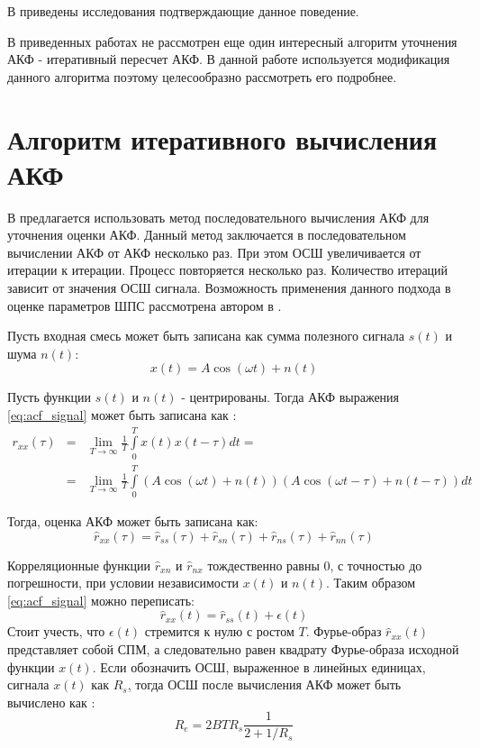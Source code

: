 В \cite{lacoss_spectral_est, chen_spectral_est, marple_1977} приведены исследования подтверждающие данное поведение.

В приведенных работах не рассмотрен еще один интересный алгоритм уточнения АКФ - итеративный пересчет АКФ. В данной работе используется
модификация данного алгоритма поэтому целесообразно рассмотреть его подробнее.

\section{Алгоритм итеративного вычисления АКФ}
\label{sec_ostanin}
В \cite{ostanin_akf} предлагается использовать метод последовательного вычисления АКФ для уточнения оценки АКФ. Данный метод
заключается в последовательном вычислении АКФ от АКФ несколько раз. При этом ОСШ увеличивается от итерации к итерации.
Процесс повторяется несколько раз. Количество итераций зависит от значения ОСШ сигнала. Возможность применения данного подхода в оценке параметров ШПС рассмотрена
автором в \cite{my_acf_cdma}.

Пусть входная смесь может быть записана как сумма полезного сигнала ${s(t)}$ и шума ${n(t)}$:
\begin{equation}
	\label{eq:acf_signal}
	x(t) = A \cos{(\omega t)} + n(t)
\end{equation}

Пусть функции ${s(t)}$ и ${n(t)}$ - центрированы. Тогда АКФ выражения \ref{eq:acf_signal} может быть записана как \cite{book_max}:
\begin{eqnarray}
	\label{eq:acf_rss_signal}
	r_{xx}(\tau)	& = & \lim_{T \to \infty} \frac{1}{T} \int \limits_0^T x(t)x(t-\tau)dt = \nonumber \\
			& = & \lim_{T \to \infty} \frac{1}{T} \int \limits_0^T (A \cos{(\omega t)} + n(t))(A \cos{(\omega t - \tau)} + n(t - \tau))dt
\end{eqnarray}

Тогда, оценка АКФ может быть записана как:
\begin{equation}
	\label{eq:acf_rss_signal_full}
	\hat{r}_{xx}(\tau)=\hat{r}_{ss}(\tau)+\hat{r}_{sn}(\tau)+\hat{r}_{ns}(\tau) + \hat{r}_{nn}(\tau)
\end{equation}

Корреляционные функции ${\hat{r}_{xn}}$ и ${\hat{r}_{nx}}$ тождественно равны 0, с точностью до погрешности, при условии независимости
${x(t)}$ и ${n(t)}$. Таким образом \ref{eq:acf_signal} можно переписать:
\begin{equation}
	\label{eq:acf_rss_signal_new}
	\hat{r}_{xx}(t) = \hat{r}_{ss}(t) + \epsilon (t)
\end{equation}
Стоит учесть, что ${\epsilon (t)}$ стремится к нулю с ростом ${T}$. Фурье-образ ${\hat{r}_{xx}(t)}$
представляет собой СПМ, а следовательно равен квадрату Фурье-образа исходной функции ${x(t)}$.
Если обозначить ОСШ, выраженное в линейных единицах, сигнала ${x(t)}$ как ${R_s}$, тогда ОСШ после вычисления АКФ может быть вычислено
как \cite{book_max}:
\begin{equation}
	\label{eq:acf_snr_est}
	R_e=2BTR_s \frac{1}{2+1/R_s}
\end{equation}


